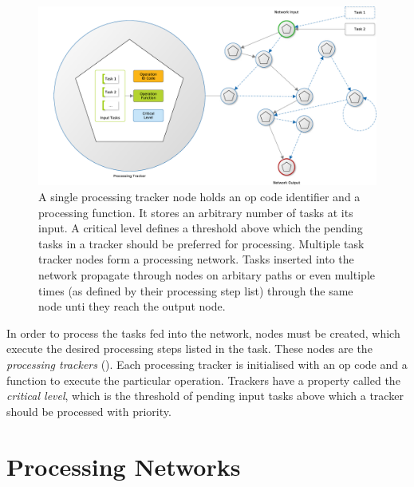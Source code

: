 \begin{figure}%
\begin{center}
	\includegraphics[width=1.0\columnwidth]{images/task_network}
	\caption{A single processing tracker node holds an op code identifier
		and a processing function. It stores an arbitrary number of
		tasks at its input. A critical level defines a threshold above
		which the pending tasks in a tracker should be preferred for
		processing. Multiple task tracker nodes form a processing
		network. Tasks inserted into the network propagate through
		nodes on arbitary paths or even multiple times (as defined by
		their processing step list) through the same node unti they
		reach the output node.}
	\label{fig:task_network}
\end{center}
\end{figure}

In order to process the tasks fed into the network, nodes must be created,
which execute the desired processing steps listed in the task.  These nodes are
the \emph{processing trackers} (). Each processing
tracker is initialised with an op code and a function to execute the particular
operation. Trackers have a property called the \emph{critical level}, which is
the threshold of pending input tasks above which a tracker should be processed
with priority.


\section{Processing Networks}


